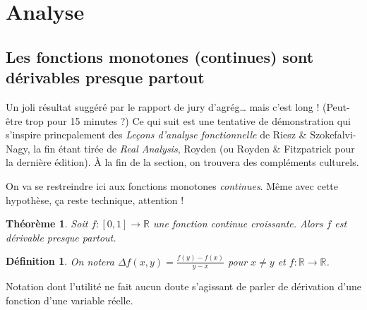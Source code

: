 \documentclass[a4paper, 11pt]{article}
\def\R{\mathbb{R}}
\newtheorem*{definition}{Définition}
\newtheorem*{theorem}{Théorème}
\begin{document}
\newpage

\section{Analyse}

\subsection{Les fonctions monotones (continues) sont dérivables presque partout}

Un joli résultat suggéré par le rapport de jury d'agrég… mais c'est long !
(Peut-être trop pour 15 minutes ?) Ce qui suit est une tentative de
démonstration qui s'inspire princpalement des \emph{Leçons d'analyse
  fonctionnelle} de Riesz \& Szokefalvi-Nagy, la fin étant tirée de \emph{Real
  Analysis}, Royden (ou Royden \& Fitzpatrick pour la dernière édition). À la
fin de la section, on trouvera des compléments culturels.

On va se restreindre ici aux fonctions monotones \emph{continues}. Même avec
cette hypothèse, ça reste technique, attention !
\begin{theorem}
  Soit $f : [0,1] \to \R$ une fonction continue croissante. Alors $f$ est
  dérivable presque partout.
\end{theorem}

\begin{definition}
  On notera $\displaystyle \Delta f(x,y) = \frac{f(y) - f(x)}{y - x}$ pour $x
  \neq y$ et $f : \R \to \R$.
\end{definition}
Notation dont l'utilité ne fait aucun doute s'agissant de parler de dérivation
d'une fonction d'une variable réelle.
\end{document}
